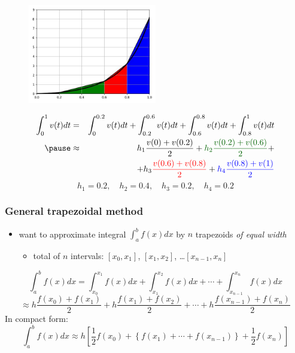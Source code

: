\documentclass[english,14pt]{beamer}
\newcommand\red[1]{{\color{red} #1}}
\newcommand\blue[1]{{\color{blue} #1}}
\newcommand\darkGreen[1]{{\color{darkGreen} #1}}
\begin{document}
\begin{frame}[fragile]

\frametitle{}

\begin{figure}[ht]
	\centering
	\includegraphics[width=0.5\textwidth]{figures/fourPanel}
\end{figure}
\vspace*{-5mm}
{\small
\begin{eqnarray*}
\int_0^1 v(t)dt & = & \int_0^{0.2} v(t)dt + \int_{0.2}^{0.6} v(t)dt + \int_{0.6}^{0.8} v(t)dt + \int_{0.8}^1 v(t)dt \\
\pause
&\approx & h_1 \frac{v(0) + v(0.2)}{2} + \darkGreen{h_2 \frac{v(0.2) + v(0.6)}{2}} + \\
& & +h_3 \red{\frac{v(0.6) + v(0.8)}{2}} + \blue{h_4 \frac{v(0.8) + v(1)}{2}} 
\end{eqnarray*}
}
\pause
\vspace*{-5mm}
\[
h_1 = 0.2, \quad h_2 = 0.4, \quad h_3 = 0.2, \quad h_4 = 0.2
\]

\end{frame}


\begin{frame}[fragile]

\frametitle{General trapezoidal method}

\begin{itemize}
	\item want to approximate integral $\int_a^b f(x)dx$ by $n$ trapezoids \emph{of equal width}
	\begin{itemize}
		\item total of $n$ intervals: $[x_0,x_1]$, $[x_1,x_2]$, \ldots $[x_{n-1},x_n]$
	\end{itemize}
\end{itemize}

{\small
\[
\int_a^b f(x)dx = \int_{x_0}^{x_1} f(x)dx + \int_{x_1}^{x_2} f(x)dx + \cdots + \int_{x_{n-1}}^{x_n} f(x)dx
\]
\pause
\[
\approx h\frac{f(x_0)+f(x_1)}{2} + h\frac{f(x_1)+f(x_2)}{2} + \cdots + h\frac{f(x_{n-1}) + f(x_n)}{2}
\]
\pause
In compact form:
\blue{
\[
\int_a^b f(x)dx \approx h \left[ \frac{1}{2}f(x_0) + \left\{ f(x_1)+\cdots+f(x_{n-1}) \right\} + \frac{1}{2}f(x_n) \right]
\]
}}

\end{frame}
\end{document}

